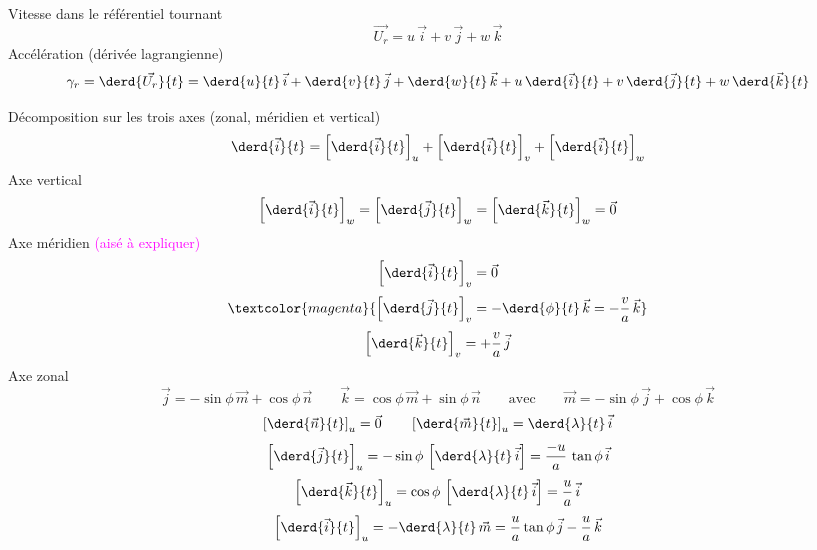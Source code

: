 \sk
Vitesse dans le référentiel tournant 
\[
\vec{U_r} = u\,\vec{i} + v\,\vec{j} + w\,\vec{k}
\]
\noindent Accélération (dérivée lagrangienne)
\[
\gamma_r = \derd{\vec{U_r}}{t}=\derd{u}{t}\,\vec{i}+\derd{v}{t}\,\vec{j}+\derd{w}{t}\,\vec{k} +u\,\derd{\vec{i}}{t}+v\,\derd{\vec{j}}{t}+w\,\derd{\vec{k}}{t}
\]


\sk
Décomposition sur les trois axes (zonal, méridien et vertical)
\[
\derd{\vec{i}}{t} = \left[ \derd{\vec{i}}{t} \right]_u + \left[ \derd{\vec{i}}{t} \right]_v + \left[ \derd{\vec{i}}{t} \right]_w
\]
\noindent Axe vertical
\[
\left[ \derd{\vec{i}}{t} \right]_w = \left[ \derd{\vec{j}}{t} \right]_w = \left[ \derd{\vec{k}}{t} \right]_w = \vec{0}
\]
\noindent Axe méridien \textcolor{magenta}{(aisé à expliquer)}
\[
\left[ \derd{\vec{i}}{t} \right]_v = \vec{0}
\]
\[
\textcolor{magenta}{\left[ \derd{\vec{j}}{t} \right]_v = - \derd{\phi}{t} \, \vec{k} = - \dfrac{v}{a} \, \vec{k}}
\]
\[
\left[ \derd{\vec{k}}{t} \right]_v = + \dfrac{v}{a} \, \vec{j}
\]
\noindent Axe zonal
\[
\vec{j} = -\sin\phi \, \vec{m} + \cos\phi \, \vec{n} \qquad \vec{k} =  \cos\phi \, \vec{m} + \sin\phi \, \vec{n} \qquad \textrm{avec} \qquad \vec{m} = -\sin\phi \, \vec{j} + \cos\phi \, \vec{k}
\]
\[
\left[ \derd{\vec{n}}{t} \right]_u = \vec{0} \qquad \left[ \derd{\vec{m}}{t} \right]_u = \derd{\lambda}{t} \, \vec{i}
\]
\[
\left[ \derd{\vec{j}}{t} \right]_u = -\sin\phi \, \left[ \derd{\lambda}{t} \, \vec{i} \right] = \dfrac{-u}{a} \, \tan\phi \, \vec{i}
\]
\[
\left[ \derd{\vec{k}}{t} \right]_u =  \cos\phi \, \left[ \derd{\lambda}{t} \, \vec{i} \right] = \dfrac{u}{a} \, \vec{i}
\]
\[
\left[ \derd{\vec{i}}{t} \right]_u = - \derd{\lambda}{t} \, \vec{m} = \dfrac{u}{a} \tan\phi \, \vec{j} - \dfrac{u}{a} \,\vec{k}
\]

